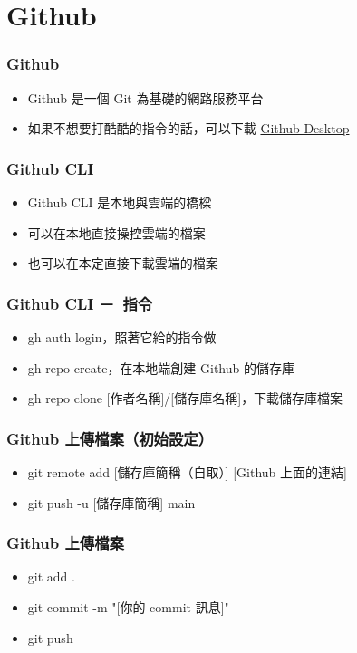 \documentclass[mathserif]{beamer}
\begin{document}
\section{Github}

\begin{frame}
    \frametitle{Github}
    \begin{itemize}
        \item Github 是一個 Git 為基礎的網路服務平台
        \item<2-> 如果不想要打酷酷的指令的話，可以下載 \href{https://desktop.github.com/}{Github Desktop}
    \end{itemize}
\end{frame}

\begin{frame}
    \frametitle{Github CLI}
    \begin{itemize}
        \item Github CLI 是本地與雲端的橋樑
        \item 可以在本地直接操控雲端的檔案
        \item 也可以在本定直接下載雲端的檔案
    \end{itemize}
\end{frame}

\begin{frame}
    \frametitle{Github CLI －\ 指令}
    \begin{itemize}
        \item {\color{red}gh auth login}，照著它給的指令做
        \item<2-> {\color{red}gh repo create}，在本地端創建 Github 的儲存庫
        \item<3-> {\color{red}gh repo clone [作者名稱]/[儲存庫名稱]}，下載儲存庫檔案
    \end{itemize}
\end{frame}

\begin{frame}
    \frametitle{Github 上傳檔案（初始設定）}
    \begin{itemize}
        \item {\color{red}git remote add [儲存庫簡稱（自取）] [Github 上面的連結]}
        \item {\color{red}git push -u [儲存庫簡稱] main}
    \end{itemize}
\end{frame}

\begin{frame}
    \frametitle{Github 上傳檔案}
    \begin{itemize}
        \item {\color{red}git add .}
        \item {\color{red}git commit -m "[你的 commit 訊息]"}
        \item {\color{red}git push}
    \end{itemize}
\end{frame}
\end{document}
